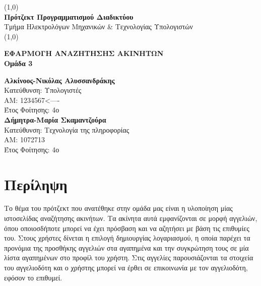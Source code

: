 \documentclass{acmart}
\begin{document}
       \begin{titlepage}
              \begin{center}
              \vspace*{1.5cm}

              \line(1,0){\textwidth}\\
              \textbf{Πρότζεκτ Προγραμματισμού Διαδικτύου}\\
              \vspace{0.2cm}
              Τμήμα Ηλεκτρολόγων Μηχανικών \& Τεχνολογίας Υπολογιστών\\
              \line(1,0){\textwidth}\\
               
              \vspace{1.5cm}
              
              \textbf{
              ΕΦΑΡΜΟΓΗ ΑΝΑΖΗΤΗΣΗΣ ΑΚΙΝΗΤΩΝ\\
              Ομάδα 3\\} 
              \vspace{1cm}

              \textbf{Αλκίνοος-Νικόλας Αλυσσανδράκης}\\
              Κατεύθυνση: Υπολογιστές\\
              ΑΜ: 1234567<----\\
              Έτος Φοίτησης: 4ο\\
              \vspace{0.8cm}
              \textbf{Δήμητρα-Μαρία Σκαμαντζούρα}\\
              Κατεύθυνση: Τεχνολογία της πληροφορίας\\
              ΑΜ: 1072713\\
              Έτος Φοίτησης: 4ο\\

              \vspace{0.8cm}


              
              \end{center}
       \end{titlepage}
\tableofcontents
\newpage

\section{Περίληψη}
Το θέμα του πρότζεκτ που ανατέθηκε στην ομάδα μας είναι η υλοποίηση μίας ιστοσελίδας αναζήτησης ακινήτων. Τα ακίνητα αυτά εμφανίζονται σε μορφή αγγελιών, όπου οποιοσδήποτε μπορεί να έχει πρόσβαση και να αζητήσει με βάση τις επιθυμίες του. Στους χρήστες δίνεται η επιλογή δημιουργίας λογαριασμού, η οποία παρέχει τα προνόμια της προσθήκης αγγελιών στα αγαπημένα και την συγκρώτηση τους σε μία λίστα αγαπημένων στο προφίλ του χρήστη. Στις αγγελίες παρουσιάζονται τα στοιχεία του αγγελιοδότη και ο χρήστης μπορεί να έρθει σε επικοινωνία με τον αγγελιοδότη, εφόσον το επιθυμεί.
\end{document}
